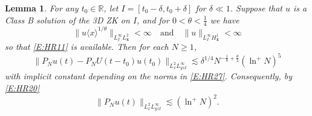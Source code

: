 \documentclass[12pt,letterpaper]{amsart}
\newcommand{\la}{\langle}
\newcommand{\ra}{\rangle}
\newtheorem{lemma}[theorem]{Lemma}
\theoremstyle{remark}
\numberwithin{equation}{section}
\numberwithin{theorem}{section}
\numberwithin{table}{section}
\begin{document}
\begin{lemma}
\label{L:maximal-compare}
For any $t_0\in \mathbb{R}$, let $I=[t_0-\delta,t_0+\delta]$ for  $\delta \ll 1$.  Suppose that $u$ is a Class B solution of the 3D ZK on $I$, and for $0<\theta<\frac14$ we have
\begin{equation}
\label{E:HR27}
\| u\la x \ra^{1/\theta} \|_{L_I^\infty L_{\mathbf{x}}^2} <\infty \quad \mbox{and} \quad \|u \|_{L_I^\infty H_{\mathbf{x}}^1} < \infty
\end{equation}
so that \eqref{E:HR11} is available.
Then for each $N\geq 1$,
$$
\|P_N u(t) -P_NU(t-t_0) u(t_0) \|_{L_x^2 L_{yz I}^\infty} \lesssim \delta^{1/4} N^{-\frac18+\frac{\theta}{2}}(\ln^+ N)^5
$$
with implicit constant depending on the norms in \eqref{E:HR27}.  Consequently, by \eqref{E:HR20}
\begin{equation}
\label{E:HR28}
\| P_N u(t)  \|_{L_x^2 L_{yz I}^\infty} \lesssim (\ln^+ N)^2.
\end{equation}
\end{lemma}
\end{document}
